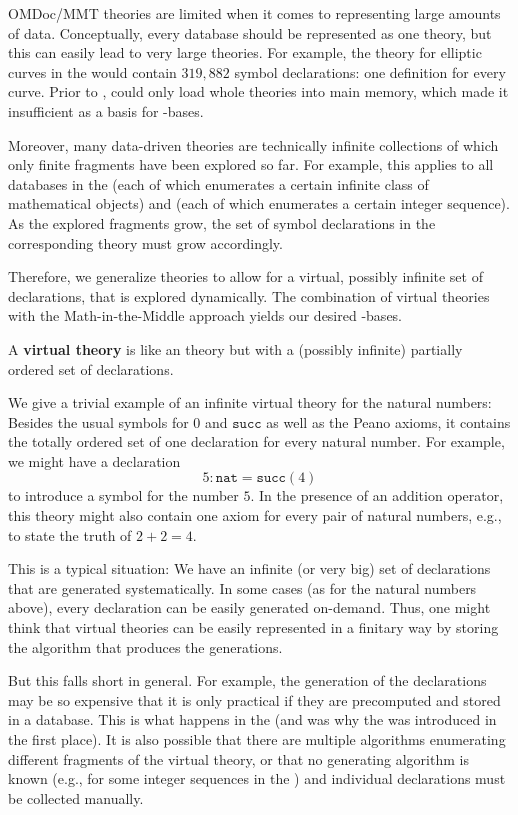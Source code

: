 OMDoc/MMT theories are limited when it comes to representing large amounts of data.
Conceptually, every database should be represented as one theory, but this can easily lead
to very large theories.  For example, the theory for elliptic curves in the \LMFDB would
contain $319,882$ symbol declarations: one definition for every curve.  Prior to \pn, \MMT
could only load whole theories into main memory, which made it insufficient as a basis for
\DKS-bases.

Moreover, many data-driven theories are technically infinite collections of which only finite fragments have been explored so far.
For example, this applies to all databases in the \LMFDB (each of which enumerates a certain infinite class of mathematical objects) and \OEIS (each of which enumerates a certain integer sequence).
As the explored fragments grow, the set of symbol declarations in the corresponding \MMT theory must grow accordingly.

Therefore, we generalize \MMT theories to allow for a virtual, possibly infinite set of declarations, that is explored dynamically.
The combination of virtual theories with the Math-in-the-Middle approach yields our desired \DKS-bases.

\begin{mydef}
  A \textbf{virtual theory} is like an \MMT theory but with a (possibly infinite) partially ordered set of declarations.
\end{mydef}

We give a trivial example of an infinite virtual theory for the natural numbers:
Besides the usual symbols for $0$ and $\mathtt{succ}$ as well as the Peano axioms, it contains the totally ordered set of one declaration for every natural number.
For example, we might have a declaration
 \[5:\mathtt{nat}=\mathtt{succ}(4)\]
to introduce a symbol for the number $5$.
In the presence of an addition operator, this theory might also contain one axiom for every pair of natural numbers, e.g., to state the truth of $2+2=4$.

This is a typical situation: We have an infinite (or very big) set of declarations that are generated systematically.
In some cases (as for the natural numbers above), every declaration can be easily generated on-demand.
Thus, one might think that virtual theories can be easily represented in a finitary way by storing the algorithm that produces the generations.

But this falls short in general.  For example, the generation of the declarations may be
so expensive that it is only practical if they are precomputed and stored in a database.
This is what happens in the \LMFDB (and was why the \LMFDB was introduced in the first
place).  It is also possible that there are multiple algorithms enumerating different
fragments of the virtual theory, or that no generating algorithm is known (e.g., for some
integer sequences in the \OEIS) and individual declarations must be collected manually.


